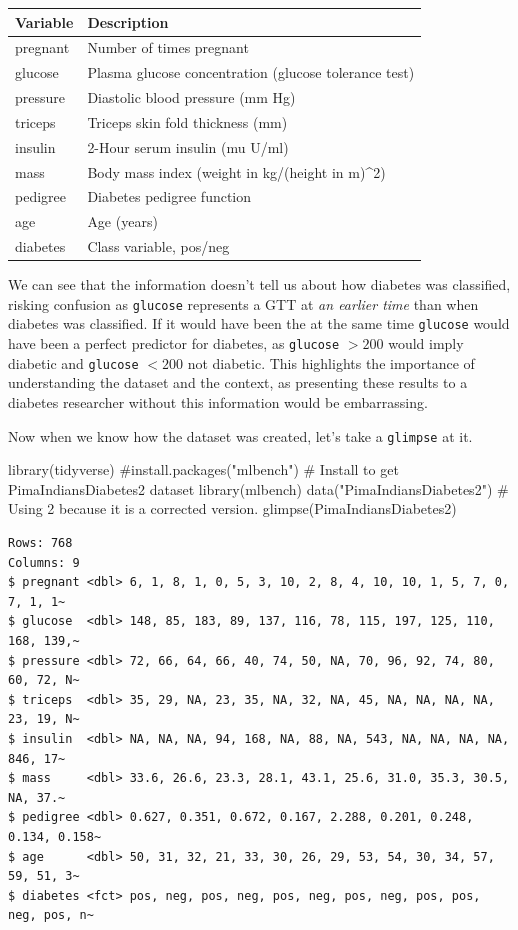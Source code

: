 \documentclass[
  letterpaper,
  DIV=11,
  numbers=noendperiod]{scrreprt}
\newenvironment{Shaded}{\begin{snugshade}}{\end{snugshade}}
\newcommand{\CommentTok}[1]{\textcolor[rgb]{0.37,0.37,0.37}{#1}}
\newcommand{\FunctionTok}[1]{\textcolor[rgb]{0.28,0.35,0.67}{#1}}
\newcommand{\NormalTok}[1]{\textcolor[rgb]{0.00,0.23,0.31}{#1}}
\newcommand{\StringTok}[1]{\textcolor[rgb]{0.13,0.47,0.30}{#1}}
\begin{document}
\begin{longtable}[]{@{}ll@{}}
\toprule\noalign{}
Variable & Description \\
\midrule\noalign{}
\endhead
\bottomrule\noalign{}
\endlastfoot
pregnant & Number of times pregnant \\
glucose & Plasma glucose concentration (glucose tolerance test) \\
pressure & Diastolic blood pressure (mm Hg) \\
triceps & Triceps skin fold thickness (mm) \\
insulin & 2-Hour serum insulin (mu U/ml) \\
mass & Body mass index (weight in kg/(height in m)\^{}2) \\
pedigree & Diabetes pedigree function \\
age & Age (years) \\
diabetes & Class variable, pos/neg \\
\end{longtable}

We can see that the information doesn't tell us about how diabetes was
classified, risking confusion as \texttt{glucose} represents a GTT at
\emph{an earlier time} than when diabetes was classified. If it would
have been the at the same time \texttt{glucose} would have been a
perfect predictor for diabetes, as \texttt{glucose} \(> 200\) would
imply diabetic and \texttt{glucose} \(< 200\) not diabetic. This
highlights the importance of understanding the dataset and the context,
as presenting these results to a diabetes researcher without this
information would be embarrassing.

Now when we know how the dataset was created, let's take a
\texttt{glimpse} at it.

\begin{Shaded}
\begin{Highlighting}[]
\FunctionTok{library}\NormalTok{(tidyverse)}
\CommentTok{\#install.packages("mlbench") \# Install to get PimaIndiansDiabetes2 dataset}
\FunctionTok{library}\NormalTok{(mlbench)}
\FunctionTok{data}\NormalTok{(}\StringTok{"PimaIndiansDiabetes2"}\NormalTok{) }\CommentTok{\# Using 2 because it is a corrected version.}
\FunctionTok{glimpse}\NormalTok{(PimaIndiansDiabetes2)}
\end{Highlighting}
\end{Shaded}

\begin{verbatim}
Rows: 768
Columns: 9
$ pregnant <dbl> 6, 1, 8, 1, 0, 5, 3, 10, 2, 8, 4, 10, 10, 1, 5, 7, 0, 7, 1, 1~
$ glucose  <dbl> 148, 85, 183, 89, 137, 116, 78, 115, 197, 125, 110, 168, 139,~
$ pressure <dbl> 72, 66, 64, 66, 40, 74, 50, NA, 70, 96, 92, 74, 80, 60, 72, N~
$ triceps  <dbl> 35, 29, NA, 23, 35, NA, 32, NA, 45, NA, NA, NA, NA, 23, 19, N~
$ insulin  <dbl> NA, NA, NA, 94, 168, NA, 88, NA, 543, NA, NA, NA, NA, 846, 17~
$ mass     <dbl> 33.6, 26.6, 23.3, 28.1, 43.1, 25.6, 31.0, 35.3, 30.5, NA, 37.~
$ pedigree <dbl> 0.627, 0.351, 0.672, 0.167, 2.288, 0.201, 0.248, 0.134, 0.158~
$ age      <dbl> 50, 31, 32, 21, 33, 30, 26, 29, 53, 54, 30, 34, 57, 59, 51, 3~
$ diabetes <fct> pos, neg, pos, neg, pos, neg, pos, neg, pos, pos, neg, pos, n~
\end{verbatim}
\end{document}
